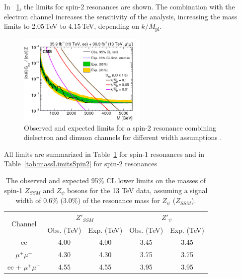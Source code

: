 In \figurename~\ref{fig:limitSpin2Comb}, the limits for spin-2 resonances are shown. The combination with the electron channel increases the sensitivity of the analysis, increasing the mass limits to 2.05\,TeV to 4.15\,TeV, depending on $k/\bar{M}_{\mathrm{pl}}$.

\begin{figure}[htbp]
\centering
\includegraphics[width=0.55\textwidth]{Images/Cap5/Limit_mmee_RS}
\caption{Observed and expected limits for a spin-2 resonance combining dielectron and dimuon channels for different width assumptions \cite{PAS}.}
\label{fig:limitSpin2Comb}
\end{figure}
 
All limits are summarized in Table~\ref{tab:massLimitsSpin1} for spin-1 resonances and in Table~\ref{tab:massLimitsSpin2} for spin-2 resonances
 
\begin{table}[!hbt]
\begin{center} 
\caption{The observed and expected 95\% CL lower limits on the masses of spin-1 $Z_{SSM}$ and $Z_\psi$ bosons for the 13 TeV data, assuming a signal width of 0.6\% (3.0\%) of the resonance mass for $Z_\psi$ ($Z_{SSM}$).}
\begin{tabular}{ccccc} 
\multirow{2}{*}{Channel}  & \multicolumn{2}{c}{$Z'_{SSM}$} & \multicolumn{2}{c}{$Z'_\psi$}  \\
                          & Obs. (TeV) & Exp. (TeV)      & Obs. (TeV)  & Exp. (TeV)      \\\hline
ee                        &  4.00      & 4.00            & 3.45        & 3.45            \\ 
$\mu^+\mu^-$              &  4.30      & 4.30            & 3.75        & 3.75            \\
ee + $\mu^+\mu^-$         &  4.55      & 4.55            & 3.95        & 3.95            \\
\end{tabular}  
\label{tab:massLimitsSpin1}
\end{center} 
\end{table} 

